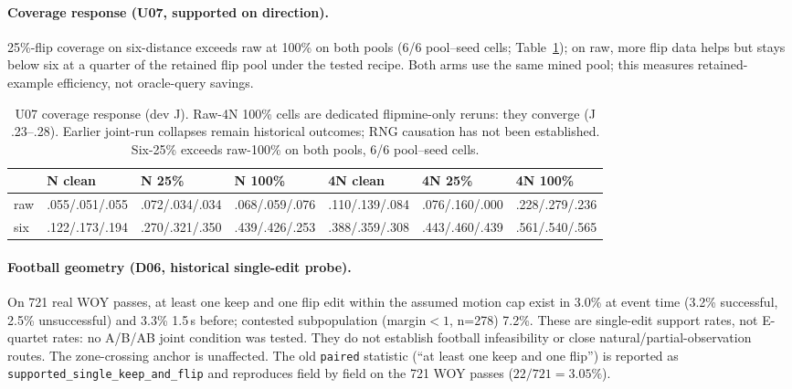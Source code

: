 \paragraph{Coverage response (U07, supported on direction).} 25\%-flip coverage on six-distance exceeds raw at 100\% on both pools (6/6 pool--seed cells; Table~\ref{tab:u07}); on raw, more flip data helps but stays below six at a quarter of the retained flip pool under the tested recipe. Both arms use the same mined pool; this measures retained-example efficiency, not oracle-query savings.
\begin{table}[t]
\centering
\footnotesize
\setlength{\tabcolsep}{3pt}
\begin{tabular}{@{}lllllll@{}}
\toprule
 & N clean & N 25\% & N 100\% & 4N clean & 4N 25\% & 4N 100\% \\
\midrule
raw & .055/.051/.055 & .072/.034/.034 & .068/.059/.076 & .110/.139/.084 & .076/.160/.000 & .228/.279/.236 \\
six & .122/.173/.194 & .270/.321/.350 & .439/.426/.253 & .388/.359/.308 & .443/.460/.439 & .561/.540/.565 \\
\bottomrule
\end{tabular}
\caption{U07 coverage response (dev J). Raw-4N 100\% cells are dedicated flipmine-only reruns: they converge (J .23--.28). Earlier joint-run collapses remain historical outcomes; RNG causation has not been established. Six-25\% exceeds raw-100\% on both pools, 6/6 pool--seed cells.}
\label{tab:u07}
\end{table}
\paragraph{Football geometry (D06, historical single-edit probe).} On 721 real WOY passes, at least one keep and one flip edit within the assumed motion cap exist in 3.0\% at event time (3.2\% successful, 2.5\% unsuccessful) and 3.3\% 1.5\,s before; contested subpopulation (margin$<1$, n=278) 7.2\%. These are single-edit support rates, not E-quartet rates: no A/B/AB joint condition was tested. They do not establish football infeasibility or close natural/partial-observation routes. The zone-crossing anchor is unaffected. The old \texttt{paired} statistic (``at least one keep and one flip'') is reported as \texttt{supported\_single\_keep\_and\_flip} and reproduces field by field on the 721 WOY passes ($22/721=3.05\%$).
